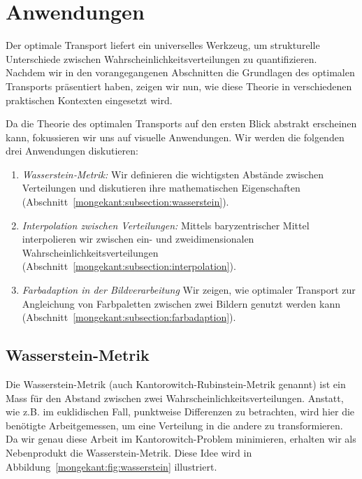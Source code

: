 %
%
%
%
\section{Anwendungen%
\label{mongekant:section:teil3}}

Der optimale Transport liefert ein universelles Werkzeug,
um strukturelle Unterschiede zwischen Wahrscheinlichkeitsverteilungen zu quantifizieren.
Nachdem wir in den vorangegangenen Abschnitten
die Grundlagen des optimalen Transports präsentiert haben,
zeigen wir nun,
wie diese Theorie in verschiedenen praktischen Kontexten eingesetzt wird.

Da die Theorie des optimalen Transports auf den ersten Blick abstrakt erscheinen kann,
fokussieren wir uns auf visuelle Anwendungen.
Wir werden die folgenden drei Anwendungen diskutieren:
\begin{enumerate}
\item \emph{Wasserstein‑Metrik:}
Wir definieren die wichtigsten Abstände zwischen Verteilungen und
diskutieren ihre mathematischen Eigenschaften
(Abschnitt~\ref{mongekant:subsection:wasserstein}).
\item \emph{Interpolation zwischen Verteilungen:}
Mittels baryzentrischer Mittel interpolieren
wir zwischen ein- und zweidimensionalen Wahrscheinlichkeitsverteilungen
(Abschnitt~\ref{mongekant:subsection:interpolation}).
\item \emph{Farbadaption in der Bildverarbeitung}
Wir zeigen,
wie optimaler Transport zur Angleichung von Farbpaletten
zwischen zwei Bildern genutzt werden kann
(Abschnitt~\ref{mongekant:subsection:farbadaption}).
\end{enumerate}

\subsection{Wasserstein-Metrik%
\label{mongekant:subsection:wasserstein}}

Die Wasserstein-Metrik (auch Kantorowitch-Rubinstein-Metrik genannt)
ist ein Mass für den Abstand zwischen zwei Wahrscheinlichkeitsverteilungen.
Anstatt,
wie z.B. im euklidischen Fall,
punktweise Differenzen zu betrachten,
wird hier die benötigte \glqq Arbeit\grqq gemessen,
um eine Verteilung in die andere zu transformieren.
Da wir genau diese Arbeit im Kantorowitch-Problem minimieren,
erhalten wir als Nebenprodukt die Wasserstein-Metrik.
Diese Idee wird in Abbildung~\ref{mongekant:fig:wasserstein} illustriert.

